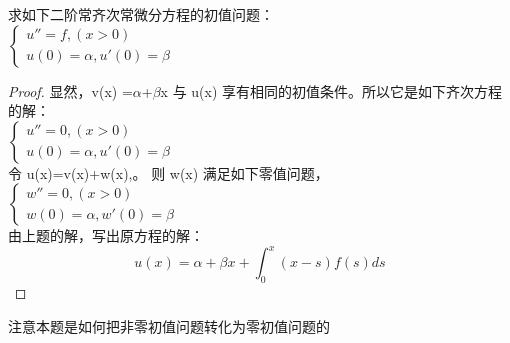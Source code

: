 \begin{example} %
	求如下二阶常齐次常微分方程的初值问题：\\
	$\begin{cases}
		u'' =f, (x>0)\\
		u(0)=\alpha, u'(0)=\beta
	\end{cases}$
	\begin{proof} 
		显然，v(x)	=$\alpha$+$\beta$x 与 u(x) 享有相同的初值条件。所以它是如下齐次方程的解：\\
		$\begin{cases}
			u'' =0, (x>0)\\
			u(0)=\alpha, u'(0)=\beta
		\end{cases}$\\
	令 u(x)=v(x)+w(x),。 则 w(x) 满足如下零值问题，\\	
	$\begin{cases}
	w'' =0, (x>0)\\
	w(0)=\alpha, w'(0)=\beta
     \end{cases}$\\	  
    由上题的解，写出原方程的解：\\
		\begin{equation*}
			u(x)=\alpha+\beta x +  \int_{0}^{x}  (x-s)f(s) ds 
		\end{equation*}      
	\end{proof}
\end{example}

\begin{note}
	注意本题是如何把非零初值问题转化为零初值问题的
\end{note}

